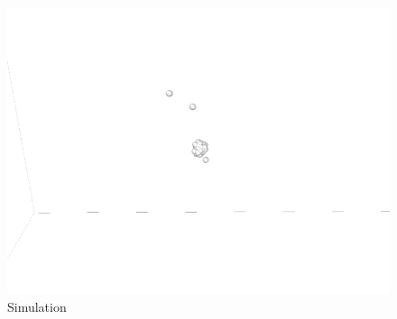 \begin{figure}[!h]
	\begin{center}
		\includegraphics[scale= 1]{Figure/5Image.png}
	\end{center}
	\caption[Simulation]{Simulation }
	\label{Simulation5}
\end{figure}